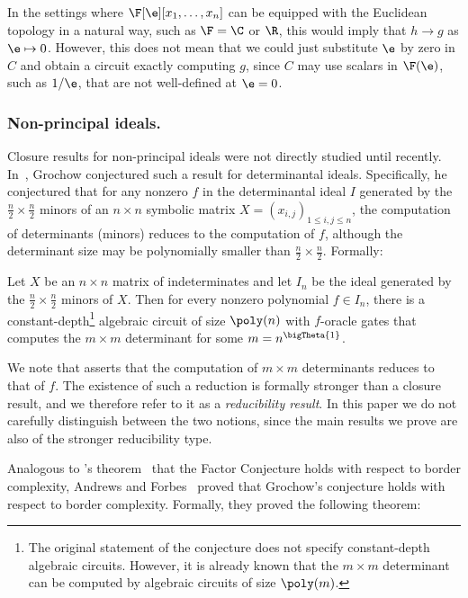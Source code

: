 \documentclass[letterpaper, 11pt]{amsart}
\begin{document}
In the settings where $\F[\e][x_1,\dots,x_n]$ can be equipped with the Euclidean topology in a natural way, such as $\F = \C$ or $\R$, this would imply that $h \to g$ as $\e \mapsto 0$.
However, this does not mean that we could just substitute $\e$ by zero in $C$ and obtain a circuit exactly computing $g$, since $C$ may use scalars in $\F(\e)$, such as $1/\e$, that are not well-defined at $\e = 0$.

\subsubsection*{Non-principal ideals.}

Closure results for non-principal ideals were not directly studied until recently.
In~\cite{Grochow20}, Grochow conjectured such a result for determinantal ideals.
Specifically, he conjectured that for any nonzero $f$ in the determinantal ideal $I$ generated by the $\tfrac{n}{2} \times \tfrac{n}{2}$ minors of an $n \times n$ symbolic matrix $X = (x_{i,j})_{1 \leq i,j \leq n}$, the computation of determinants (minors) reduces to the computation of $f$, although the determinant size may be polynomially smaller than $\tfrac{n}{2} \times \tfrac{n}{2}$.
Formally:
\begin{conj}\label{conj:grochow_det}
Let $X$ be an $n \times n$ matrix of indeterminates and let $I_n$ be the ideal generated by the $\tfrac{n}{2} \times \tfrac{n}{2}$ minors of $X$.
Then for every nonzero polynomial $f \in I_n$, there is a constant-depth\footnote{The original statement of the conjecture does not specify constant-depth algebraic circuits. However, it is already known that the $m \times m$ determinant can be computed by algebraic circuits of size $\poly(m)$.} algebraic circuit of size $\poly(n)$ with $f$-oracle gates that computes the $m \times m$ determinant for some $m = n^{\bigTheta{1}}$.
\end{conj}

\begin{remark}
We note that  asserts that the computation of $m \times m$ determinants reduces to that of $f$.
The existence of such a reduction is formally stronger than a closure result, and we therefore refer to it as a \emph{reducibility result}.
In this paper we do not carefully distinguish between the two notions, since the main results we prove are also of the stronger reducibility type.
\end{remark}

Analogous to \Burgisser's theorem~\cite{Bur04} that the Factor Conjecture holds with respect to border complexity, Andrews and Forbes~\cite{AF21} proved that Grochow's conjecture holds with respect to border complexity.
Formally, they proved the following theorem:
\end{document}
